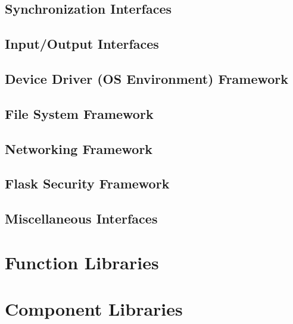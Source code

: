 \chapter{Synchronization Interfaces}		
\chapter{Input/Output Interfaces}		
\chapter{\oskit{} Device Driver (OS Environment) Framework}	
\chapter{\oskit{} File System Framework}	
\chapter{\oskit{} Networking Framework}		
\chapter{Flask Security Framework}		
\chapter{Miscellaneous \oskit{} Interfaces}     


\part{Function Libraries}
\label{function-libaries}




\part{Component Libraries}
\label{comp-libraries}

